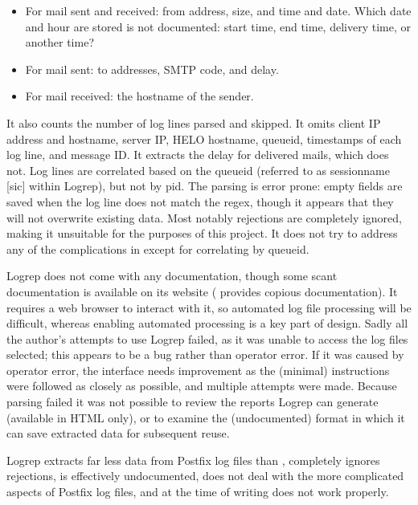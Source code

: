 \begin{itemize}

    \item For mail sent and received: from address, size, and time and
        date.  Which date and hour are stored is not documented: start
        time, end time, delivery time, or another time?

    \item For mail sent: to addresses, \gls{SMTP} code, and delay.

    \item For mail received: the hostname of the sender.

\end{itemize}

It also counts the number of log lines parsed and skipped.  It omits client
\gls{IP} address and hostname, server \gls{IP}, HELO hostname, queueid,
timestamps of each log line, and message ID\@.  It extracts the delay for
delivered mails, which \parsername{} does not.  Log lines are correlated
based on the queueid (referred to as sessionname [sic] within Logrep), but
not by \gls{pid}.  The parsing is error prone: empty fields are saved when
the log line does not match the regex, though it appears that they will not
overwrite existing data.  Most notably rejections are completely ignored,
making it unsuitable for the purposes of this project.  It does not try to
address any of the complications in  except for
correlating by queueid.

Logrep does not come with any documentation, though some scant
documentation is available on its website (\parsername{} provides copious
documentation).  It requires a web browser to interact with it, so
automated log file processing will be difficult, whereas enabling automated
processing is a key part of \parsernames{} design.  Sadly all the author's
attempts to use Logrep failed, as it was unable to access the log files
selected; this appears to be a bug rather than operator error.  If it was
caused by operator error, the interface needs improvement as the (minimal)
instructions were followed as closely as possible, and multiple attempts
were made.  Because parsing failed it was not possible to review the
reports Logrep can generate (available in HTML only), or to examine the
(undocumented) format in which it can save extracted data for subsequent
reuse.

Logrep extracts far less data from Postfix log files than \parsername{},
completely ignores rejections, is effectively undocumented, does not deal
with the more complicated aspects of Postfix log files, and at the time of
writing does not work properly.

